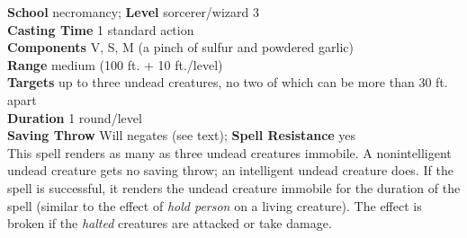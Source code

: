 \textbf{School} necromancy; \textbf{Level} sorcerer/wizard 3\\
\textbf{Casting Time} 1 standard action\\
\textbf{Components} V, S, M (a pinch of sulfur and powdered garlic)\\
\textbf{Range }medium (100 ft. + 10 ft./level)\\
\textbf{Targets} up to three undead creatures, no two of which can be more than 30 ft. apart\\
\textbf{Duration} 1 round/level\\
\textbf{Saving Throw }Will negates (see text); \textbf{Spell Resistance} yes\\
This spell renders as many as three undead creatures immobile. A nonintelligent undead creature gets no saving throw; an intelligent undead creature does. If the spell is successful, it renders the undead creature immobile for the duration of the spell (similar to the effect of \textit{hold person }on a living creature). The effect is broken if the \textit{halted }creatures are attacked or take damage.\\
